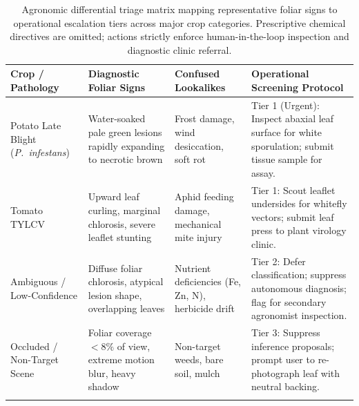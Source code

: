 \documentclass[pdflatex,sn-mathphys-num]{sn-jnl}
\theoremstyle{thmstyleone}%
\theoremstyle{thmstyletwo}%
\theoremstyle{thmstylethree}%
\begin{document}
\begin{appendices}
\begin{table}[htbp]
\caption{Agronomic differential triage matrix mapping representative foliar signs to operational escalation tiers across major crop categories. Prescriptive chemical directives are omitted; actions strictly enforce human-in-the-loop inspection and diagnostic clinic referral.}\label{tab:field_matrix}%
\footnotesize
\setlength{\tabcolsep}{3pt}%
\begin{tabular*}{\textwidth}{@{\extracolsep\fill}>{\raggedright\arraybackslash}p{2.4cm}>{\raggedright\arraybackslash}p{3.2cm}>{\raggedright\arraybackslash}p{2.4cm}>{\raggedright\arraybackslash}p{3.8cm}}
\toprule
\textbf{Crop / Pathology} & \textbf{Diagnostic Foliar Signs} & \textbf{Confused Lookalikes} & \textbf{Operational Screening Protocol} \\
\midrule
Potato Late Blight (\textit{P.~infestans}) & Water-soaked pale green lesions rapidly expanding to necrotic brown & Frost damage, wind desiccation, soft rot & Tier 1 (Urgent): Inspect abaxial leaf surface for white sporulation; submit tissue sample for assay. \\
Tomato TYLCV & Upward leaf curling, marginal chlorosis, severe leaflet stunting & Aphid feeding damage, mechanical mite injury & Tier 1: Scout leaflet undersides for whitefly vectors; submit leaf press to plant virology clinic. \\
Ambiguous / Low-Confidence & Diffuse foliar chlorosis, atypical lesion shape, overlapping leaves & Nutrient deficiencies (Fe, Zn, N), herbicide drift & Tier 2: Defer classification; suppress autonomous diagnosis; flag for secondary agronomist inspection. \\
Occluded / Non-Target Scene & Foliar coverage $< 8\%$ of view, extreme motion blur, heavy shadow & Non-target weeds, bare soil, mulch & Tier 3: Suppress inference proposals; prompt user to re-photograph leaf with neutral backing. \\
\botrule
\end{tabular*}
\end{table}


\end{appendices}
\end{document}
